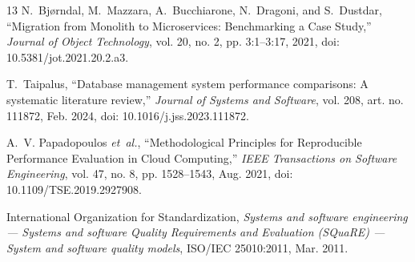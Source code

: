 \documentclass[conference]{IEEEtran}
\begin{document}
\begin{thebibliography}{13}
N.~Bjørndal, M.~Mazzara, A.~Bucchiarone, N.~Dragoni, and S.~Dustdar, ``Migration from Monolith to Microservices: Benchmarking a Case Study,'' \emph{Journal of Object Technology}, vol. 20, no. 2, pp. 3:1--3:17, 2021, doi: 10.5381/jot.2021.20.2.a3.

T.~Taipalus, ``Database management system performance comparisons: A systematic literature review,'' \emph{Journal of Systems and Software}, vol. 208, art. no. 111872, Feb. 2024, doi: 10.1016/j.jss.2023.111872.

A.~V. Papadopoulos \emph{et~al.}, ``Methodological Principles for Reproducible Performance Evaluation in Cloud Computing,'' \emph{IEEE Transactions on Software Engineering}, vol. 47, no. 8, pp. 1528--1543, Aug. 2021, doi: 10.1109/TSE.2019.2927908.

International Organization for Standardization, \emph{Systems and software engineering --- Systems and software Quality Requirements and Evaluation (SQuaRE) --- System and software quality models}, ISO/IEC 25010:2011, Mar. 2011.

\end{thebibliography}
\end{document}
